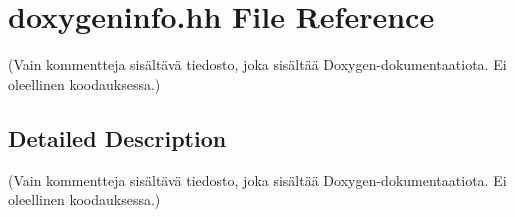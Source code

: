 \hypertarget{doxygeninfo_8hh}{\section{doxygeninfo.\-hh File Reference}
\label{doxygeninfo_8hh}
}


(Vain kommentteja sisältävä tiedosto, joka sisältää Doxygen-\/dokumentaatiota. Ei oleellinen koodauksessa.)  




\subsection{Detailed Description}
(Vain kommentteja sisältävä tiedosto, joka sisältää Doxygen-\/dokumentaatiota. Ei oleellinen koodauksessa.) 